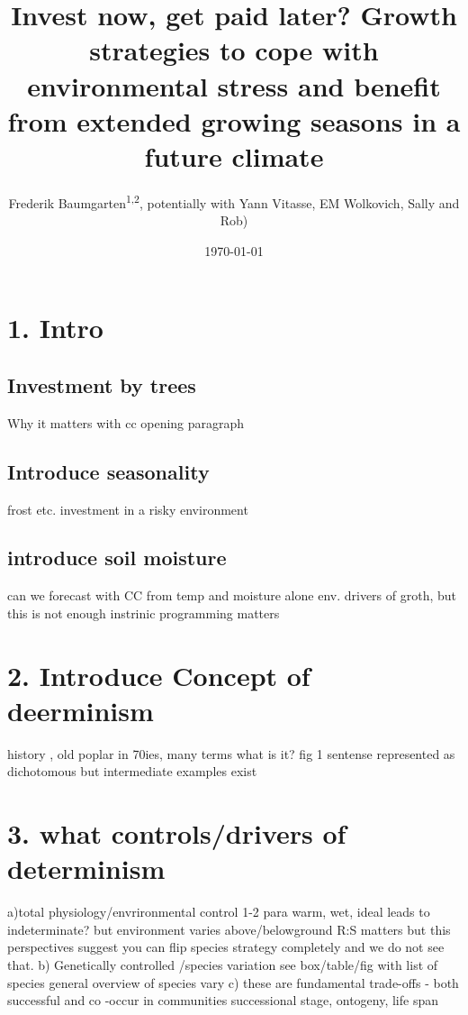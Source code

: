\documentclass{article}
\begin{document}
	\date{\today}
	
	\title{Invest now, get paid later? Growth strategies to cope with environmental stress and benefit from extended growing seasons in a future climate}
\maketitle

\author{Frederik Baumgarten\textsuperscript{1,2}, potentially with Yann Vitasse, EM Wolkovich, Sally and Rob)}



\section{1. Intro}
\subsection{Investment by trees}
Why it matters with cc opening paragraph
\subsection{Introduce seasonality}
frost etc. investment in a risky environment
\subsection{introduce soil moisture}
can we forecast with CC from temp and moisture alone
env. drivers of groth, but this is not enough
instrinic programming matters

\section{2. Introduce Concept of deerminism}
history , old poplar in 70ies, many terms
what is it? fig
1 sentense represented as dichotomous but intermediate examples exist

\section{3. what controls/drivers of determinism}
a)total physiology/envrironmental control 1-2 para
	warm, wet, ideal leads to indeterminate?
	but environment varies above/belowground
	R:S matters
	but this perspectives suggest you can flip species strategy completely and we do not see that.
b) Genetically controlled /species variation see box/table/fig with list of species
general overview of species vary
c) these are fundamental trade-offs - both successful and co -occur in communities
successional stage, ontogeny, life span
\end{document}
